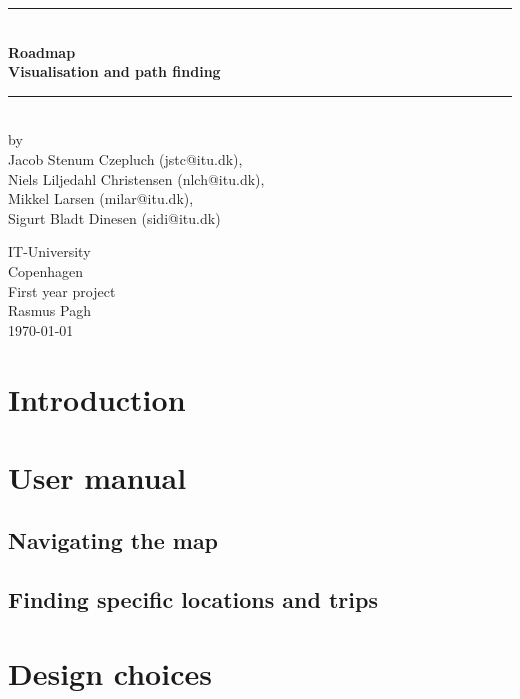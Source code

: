\documentclass[a4paper,11pt]{article}
\begin{document}
\begin{titlepage}
\centering \parindent=0pt
\newcommand{\HRule}{\rule{\textwidth}{1mm}}
 \HRule\\[1cm]\Huge\bfseries
Roadmap\\[0.7cm]
\large Visualisation and path finding\\[1cm]
\HRule\\[4cm]  \large by \\Jacob Stenum Czepluch (jstc@itu.dk), \\Niels Liljedahl Christensen (nlch@itu.dk), \\Mikkel Larsen (milar@itu.dk), \\Sigurt Bladt Dinesen (sidi@itu.dk) \\
 \normalsize %
\begin{flushleft}
IT-University\\
Copenhagen\\
First year project\\
Rasmus Pagh\\
\today \end{flushleft}
\end{titlepage}

\tableofcontents
\pagebreak

\pagebreak
\section{Introduction}


\pagebreak
\section{User manual}


\subsection{Navigating the map}


\subsection{Finding specific locations and trips}


\pagebreak
\section{Design choices}
\label{sec:Design choices}

\end{document}
